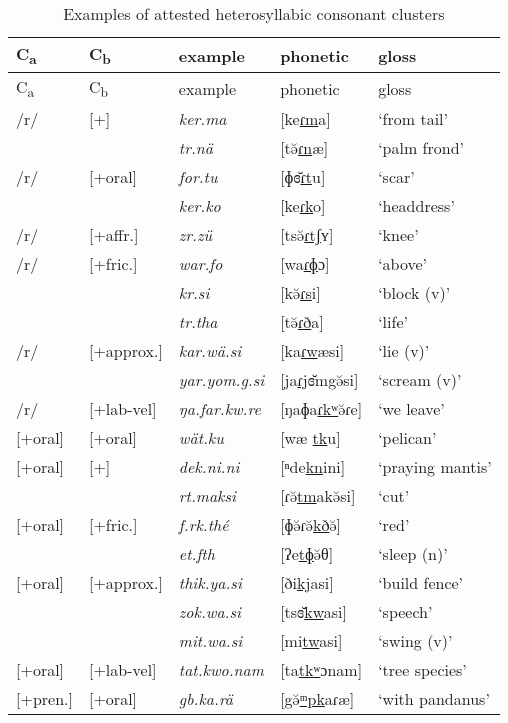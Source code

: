 \begin{longtable}{p{2cm}p{2cm}lll}
\caption{Examples of attested heterosyllabic consonant clusters}
\label{heterosyllcctableexamples}
	\\
	\lsptoprule
	C\textsubscript{a} & C\textsubscript{b} & {example} & {phonetic} & {gloss}\\\midrule
	\endfirsthead
	C\textsubscript{a} & C\textsubscript{b} & {example} & {phonetic} & {gloss}\\\midrule
	\endhead
	/r/ & [+\isi{nasal}] &\emph{ker.ma}&[ke\uline{ɾm}a] &`from tail'\\
	&&\emph{tr.nä} &[tə̆\uline{ɾn}æ] &`palm frond'\\
	/r/ &[+oral] &\emph{for.tu}&[ɸɞ̆\uline{ɾt}u] &`scar'\\
	&&\emph{ker.ko}&[ke\uline{ɾk}o] &`headdress'\\
	/r/ &[+affr.]&\emph{zr.zü}&[tsə̆\uline{ɾtʃ}ʏ] &`knee' \\
	/r/ &[+fric.] &\emph{war.fo}&[wa\uline{ɾɸ}ɔ] &`above'\\
	&&\emph{kr.si}&[kə̆\uline{ɾs}i] &`block (v)'\\
	&&\emph{tr.tha}&[tə̆\uline{ɾð}a] &`life'\\
	/r/&[+approx.]&\emph{kar.wä.si}&[ka\uline{ɾw}æsi] &`lie (v)'\\
	&&\emph{yar.yom.g.si}&[ja\uline{ɾj}ɞ̆m{\ᵑ}gə̆si] &`scream (v)'\\
	/r/&[+lab-vel]&\emph{ŋa.far.kw.re}&[ŋaɸa\uline{ɾkʷ}ə̆ɾe]&`we leave'\\
	{[+oral]}&[+oral]&\emph{wät.ku}&[wæ \uline{tk}u]&`pelican'\\
	{[+oral]} &[+\isi{nasal}]&\emph{dek.ni.ni}&[ⁿde\uline{kn}ini]&`praying mantis'\\
	&&\emph{rt.maksi}&[ɾə̆\uline{tm}akə̆si]&`cut'\\
	{[+oral]} &[+fric.]&\emph{f.rk.thé}&[ɸə̆ɾə̆\uline{kð}ə̆]&`red'\\
	&&\emph{et.fth}&[ʔe\uline{tɸ}ə̆θ]&`sleep (n)'\\
	{[+oral]} &[+approx.]&\emph{thik.ya.si}&[ði\uline{kj}asi]&`build fence'\\
	&&\emph{zok.wa.si}&[tsɞ̆\uline{kw}asi]&`speech'\\
	&&\emph{mit.wa.si}&[mi\uline{tw}asi]&`swing (v)'\\
	{[+oral]} &[+lab-vel]&\emph{tat.kwo.nam}&[ta\uline{tkʷ}ɔnam]&`tree species'\\
	{[+pren.]}&[+oral]&\emph{gb.ka.rä}&[{\ᵑ}gə̆\uline{ᵐpk}aɾæ]&`with pandanus'\\

\end{longtable}
